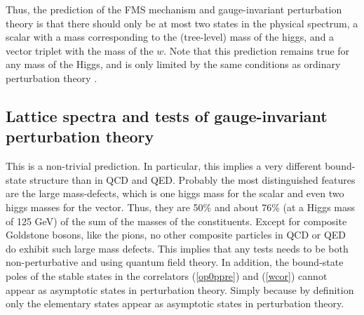 \documentclass[final,12pt]{article}
\newcommand*{\pref}[1]{(\ref{#1})}
\newcommand*{\1}{1\!\!\!\bot}
\begin{document}
Thus, the prediction of the FMS mechanism and gauge-invariant perturbation theory is that there should only be at most two states in the physical spectrum, a scalar with a mass corresponding to the (tree-level) mass of the higgs, and a vector triplet with the mass of the $w$. Note that this prediction remains true for any mass of the Higgs, and is only limited by the same conditions as ordinary perturbation theory \cite{Bohm:2001yx}.

\subsection{Lattice spectra and tests of gauge-invariant perturbation theory}\label{ss:latgipt}

This is a non-trivial prediction. In particular, this implies a very different bound-state structure than in QCD and QED. Probably the most distinguished features are the large mass-defects, which is one higgs mass for the scalar and even two higgs masses for the vector. Thus, they are 50\% and about 76\% (at a Higgs mass of 125 GeV) of the sum of the masses of the constituents. Except for composite Goldstone bosons, like the pions, no other composite particles in QCD or QED do exhibit such large mass defects. This implies that any tests needs to be both non-perturbative and using quantum field theory. In addition, the bound-state poles of the stable states in the correlators \pref{op0ppre} and \pref{wcor} cannot appear as asymptotic states in perturbation theory. Simply because by definition only the elementary states appear as asymptotic states in perturbation theory.
\end{document}
